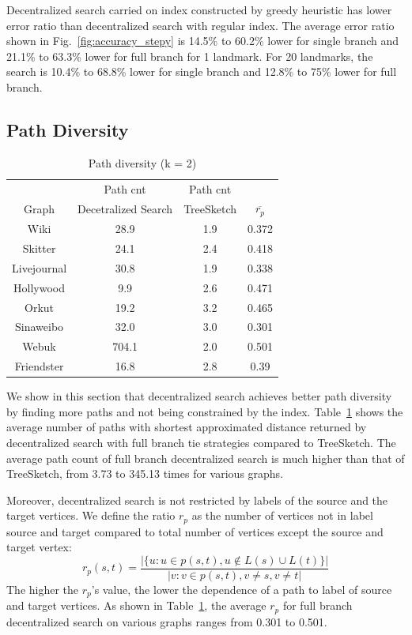 Decentralized search carried on index constructed by greedy heuristic has lower error ratio than decentralized search with regular index. The average error ratio shown in Fig.~\ref{fig:accuracy_stepy} is 14.5\% to 60.2\% lower for single branch and 21.1\% to 63.3\% lower for full branch for 1 landmark. For 20 landmarks, the search is 10.4\% to 68.8\% lower for single branch and 12.8\% to 75\% lower for full branch.

\subsection{Path Diversity}
\label{eval_diversity}

\begin{table}
	\vspace{-0.5cm}
	\caption{Path diversity (k = 2)}
  \label{table:pdiv}
  \centering
  \begin{tabular}{c|ccc} \hline
		&Path cnt&Path cnt& \\
		Graph&Decetralized Search&TreeSketch&$\overline{r_p}$ \\ \hline
		Wiki&28.9&1.9&0.372 \\ 
		Skitter&24.1&2.4&0.418 \\ 
		Livejournal&30.8&1.9&0.338 \\ 
		Hollywood&9.9&2.6&0.471 \\ 
		Orkut&19.2&3.2&0.465 \\ 
		Sinaweibo&32.0&3.0&0.301 \\ 
		Webuk&704.1&2.0&0.501 \\ 
		Friendster&16.8&2.8&0.39 \\ \hline
  \end{tabular}
	\vspace{-0.3cm}
\end{table}

We show in this section that decentralized search achieves better path diversity by finding more paths and not being constrained by the index. Table~\ref{table:pdiv} shows the average number of paths with shortest approximated distance returned by decentralized search with full branch tie strategies compared to TreeSketch. The average path count of full branch decentralized search is much higher than that of TreeSketch, from 3.73 to 345.13 times for various graphs.

Moreover, decentralized search is not restricted by labels of the source and the target vertices. We define the ratio $r_p$ as the number of vertices not in label source and target compared to total number of vertices except the source and target vertex:
\[
r_p(s,t) = \frac{|\{u:u \in p(s,t), u \notin L(s) \cup L(t)\}|}{|{v:v \in p(s,t), v \neq s, v \neq t}|}
\]
The higher the $r_p$'s value, the lower the dependence of a path to label of source and target vertices. As shown in Table~\ref{table:pdiv}, the average $r_p$ for full branch decentralized search on various graphs ranges from 0.301 to 0.501.

